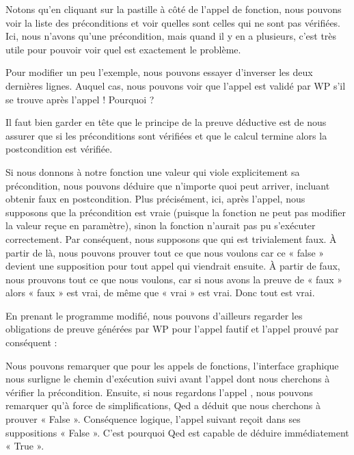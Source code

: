 
Notons qu'en cliquant sur la pastille à côté de l'appel de fonction, nous
pouvons voir la liste des préconditions et voir quelles sont celles qui ne sont
pas vérifiées. Ici, nous n'avons qu'une précondition, mais quand il y en a
plusieurs, c'est très utile pour pouvoir voir quel est exactement le problème.




Pour modifier un peu l'exemple, nous pouvons essayer d'inverser les deux 
dernières lignes. Auquel cas, nous pouvons voir que l'appel 
est validé par WP s'il se trouve après l'appel  ! 
Pourquoi ?



Il faut bien garder en tête que le principe de la preuve déductive est de nous
assurer que si les préconditions sont vérifiées et que le calcul termine alors
la postcondition est vérifiée.


Si nous donnons à notre fonction une valeur qui viole explicitement sa
précondition, nous pouvons déduire que n'importe quoi peut arriver, incluant
obtenir faux en postcondition. Plus précisément, ici, après l'appel, nous
supposons que la précondition est vraie (puisque la fonction ne peut pas
modifier la valeur reçue en paramètre), sinon la fonction n'aurait pas pu
s'exécuter correctement. Par conséquent, nous supposons que
 qui est trivialement faux. À partir de là,
nous pouvons  prouver tout ce que nous voulons car ce « false » devient une supposition pour
tout appel qui viendrait ensuite. À partir de faux, nous prouvons tout ce que 
nous voulons, car si nous avons la preuve de « faux » alors « faux » est vrai, de 
même que « vrai » est vrai. Donc tout est vrai.



En prenant le programme modifié, nous pouvons d'ailleurs regarder les obligations
de preuve générées par WP pour l'appel fautif et l'appel prouvé par conséquent :







Nous pouvons remarquer que pour les appels de fonctions, l'interface graphique
nous surligne le chemin d'exécution suivi avant l'appel dont nous cherchons à 
vérifier la précondition. Ensuite, si nous regardons l'appel ,
nous pouvons remarquer qu'à force de simplifications, Qed a déduit que nous 
cherchons à prouver « False ». Conséquence logique, l'appel suivant  
reçoit dans ses suppositions « False ». C'est pourquoi Qed est capable de déduire
immédiatement « True ».



